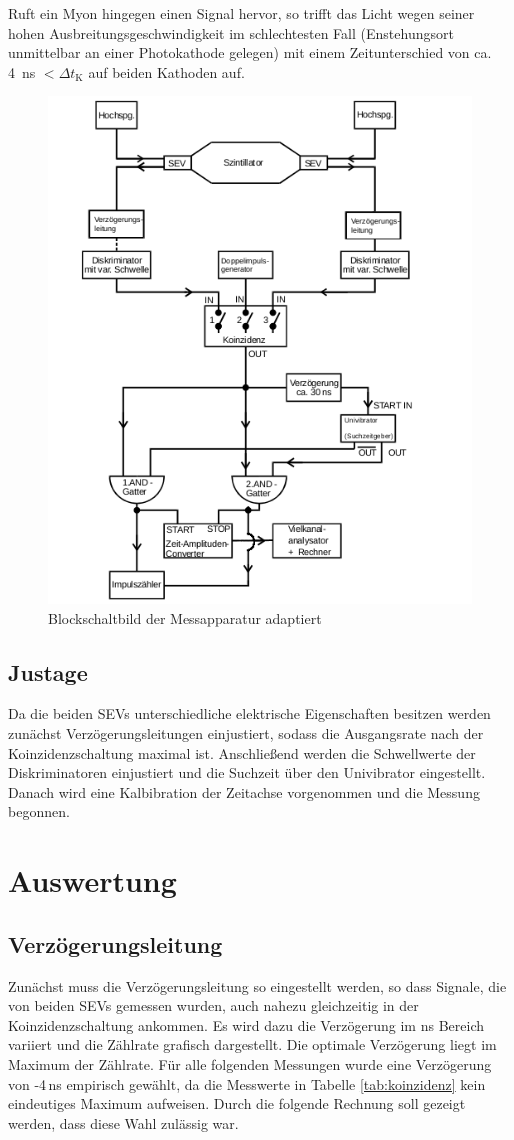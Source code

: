Ruft ein Myon hingegen einen Signal hervor, so trifft das Licht wegen seiner hohen Ausbreitungsgeschwindigkeit im schlechtesten Fall (Enstehungsort unmittelbar an einer Photokathode gelegen) mit einem Zeitunterschied von ca. \SI{4}{ns} $ < \Delta t_{\textrm{K}}$ auf beiden Kathoden auf.

\begin{figure}[H]
	\centering
	\includegraphics[width=0.7\linewidth,height=0.8\textheight,keepaspectratio]{Bilder/blockAdaptiert.png}
	\caption{Blockschaltbild der Messapparatur adaptiert \cite{Anl}}
	\label{FIG:Aufbau}
\end{figure}

\subsection{Justage}
Da die beiden SEVs unterschiedliche elektrische Eigenschaften besitzen werden zunächst Verzögerungsleitungen einjustiert, sodass die Ausgangsrate nach der Koinzidenzschaltung maximal ist. Anschließend werden die Schwellwerte der Diskriminatoren einjustiert und die Suchzeit über den Univibrator eingestellt. Danach wird eine Kalbibration der Zeitachse vorgenommen und die Messung begonnen.

\section{Auswertung}

\subsection{Verzögerungsleitung}
Zunächst muss die Verzögerungsleitung so eingestellt werden, so dass Signale, die von beiden SEVs gemessen wurden, auch nahezu gleichzeitig in der Koinzidenzschaltung ankommen. Es wird dazu die Verzögerung im ns Bereich variiert und die Zählrate grafisch dargestellt. Die optimale Verzögerung liegt im Maximum der Zählrate.
Für alle folgenden Messungen wurde eine Verzögerung von -4\,\si{ns} empirisch gewählt, da die Messwerte in Tabelle \ref{tab:koinzidenz} kein eindeutiges Maximum aufweisen. Durch die folgende Rechnung soll gezeigt werden, dass diese Wahl zulässig war. 

